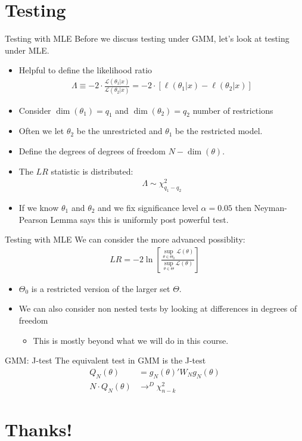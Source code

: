 \documentclass[aspectratio=169]{beamer}
\begin{document}
\section{Testing}

\begin{frame}{Testing with MLE}
Before we discuss testing under GMM, let's look at testing under MLE.
\begin{itemize}
\item Helpful to define the \alert{likelihood ratio}
\begin{align*}
\Lambda \equiv -2 \cdot \frac{\mathcal{L}(\theta_1 | x)}{\mathcal{L}(\theta_2 | x)} = -2 \cdot \left[ \ell(\theta_1 | x) - \ell(\theta_2 | x) \right]
\end{align*}
\item Consider $\dim(\theta_1) = q_1$ and $\dim(\theta_2) = q_2$ \alert{number of restrictions}
\item Often we let $\theta_2$ be the \alert{unrestricted} and $\theta_1$ be the \alert{restricted} model.
\item Define the degrees of \alert{degrees of freedom} $N - \dim(\theta)$.
\item The $LR$ statistic is distributed:
\begin{align*}
 \Lambda \sim \chi^2_{q_1-q_2}
\end{align*}
\item If we know $\theta_1$ and $\theta_2$ and we fix significance level $\alpha =0.05$ then \alert{Neyman-Pearson Lemma} says this is \alert{uniformly post powerful test}.
\end{itemize}
\end{frame}

\begin{frame}{Testing with MLE}
We can consider the more advanced possiblity:
\begin{align*}
L R=-2 \ln \left[\frac{\sup _{\theta \in \Theta_{0}} \mathcal{L}(\theta)}{\sup _{\theta \in \Theta} \mathcal{L}(\theta)}\right]
\end{align*}
\begin{itemize}
\item $\Theta_0$ is a restricted version of the larger set $\Theta$.
\item We can also consider \alert{non nested tests} by looking at differences in \alert{degrees of freedom}
\begin{itemize}
\item This is mostly beyond what we will do in this course.
\end{itemize}
\end{itemize}
\end{frame}

\begin{frame}{GMM: J-test}
The equivalent test in GMM is the \alert{J-test}
\begin{align*}
Q_N(\theta)&=g_N(\theta)' W_N  g_N(\theta) \\
N \cdot Q_N(\theta) &\rightarrow^D \chi^2_{n-k}
\end{align*}

\end{frame}



\section*{Thanks!}
\end{document}
